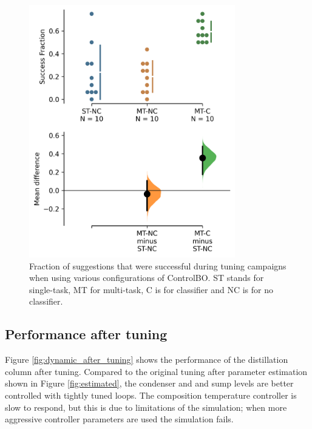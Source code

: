 \begin{figure}
    \centering
    \includegraphics[width=0.8\textwidth]{gfx/Chapter06/mean_diff_success_fraction.png}
    \caption{Fraction of suggestions that were successful during tuning campaigns when using various configurations of ControlBO. ST stands for single-task, MT for multi-task, C is for classifier and NC is for no classifier.}
    \label{fig:mean_diff_classifier}
\end{figure}


\subsection{Performance after tuning}

Figure \ref{fig:dynamic_after_tuning} shows the performance of the distillation column after tuning. Compared to the original tuning after parameter estimation shown in Figure \ref{fig:estimated}, the condenser and and sump levels are better controlled with tightly tuned loops. The composition temperature controller is slow to respond, but this is due to limitations of the simulation; when more aggressive controller parameters are used the simulation fails.

